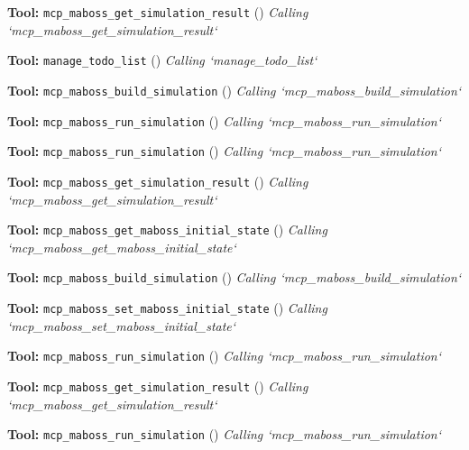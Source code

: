 \documentclass[11pt,a4paper]{article}
\begin{document}
\begin{toolokbox}
\textbf{Tool:} \texttt{mcp\_maboss\_get\_simulation\_result} (\checkmark)
\textit{Calling `mcp\_maboss\_get\_simulation\_result`}
\end{toolokbox}
\begin{toolokbox}
\textbf{Tool:} \texttt{manage\_todo\_list} (\checkmark)
\textit{Calling `manage\_todo\_list`}
\end{toolokbox}
\begin{toolokbox}
\textbf{Tool:} \texttt{mcp\_maboss\_build\_simulation} (\checkmark)
\textit{Calling `mcp\_maboss\_build\_simulation`}
\end{toolokbox}
\begin{toolokbox}
\textbf{Tool:} \texttt{mcp\_maboss\_run\_simulation} (\checkmark)
\textit{Calling `mcp\_maboss\_run\_simulation`}
\end{toolokbox}
\begin{toolokbox}
\textbf{Tool:} \texttt{mcp\_maboss\_run\_simulation} (\checkmark)
\textit{Calling `mcp\_maboss\_run\_simulation`}
\end{toolokbox}
\begin{toolokbox}
\textbf{Tool:} \texttt{mcp\_maboss\_get\_simulation\_result} (\checkmark)
\textit{Calling `mcp\_maboss\_get\_simulation\_result`}
\end{toolokbox}
\begin{toolokbox}
\textbf{Tool:} \texttt{mcp\_maboss\_get\_maboss\_initial\_state} (\checkmark)
\textit{Calling `mcp\_maboss\_get\_maboss\_initial\_state`}
\end{toolokbox}
\begin{toolokbox}
\textbf{Tool:} \texttt{mcp\_maboss\_build\_simulation} (\checkmark)
\textit{Calling `mcp\_maboss\_build\_simulation`}
\end{toolokbox}
\begin{toolokbox}
\textbf{Tool:} \texttt{mcp\_maboss\_set\_maboss\_initial\_state} (\checkmark)
\textit{Calling `mcp\_maboss\_set\_maboss\_initial\_state`}
\end{toolokbox}
\begin{toolokbox}
\textbf{Tool:} \texttt{mcp\_maboss\_run\_simulation} (\checkmark)
\textit{Calling `mcp\_maboss\_run\_simulation`}
\end{toolokbox}
\begin{toolokbox}
\textbf{Tool:} \texttt{mcp\_maboss\_get\_simulation\_result} (\checkmark)
\textit{Calling `mcp\_maboss\_get\_simulation\_result`}
\end{toolokbox}
\begin{toolokbox}
\textbf{Tool:} \texttt{mcp\_maboss\_run\_simulation} (\checkmark)
\textit{Calling `mcp\_maboss\_run\_simulation`}
\end{toolokbox}
\end{document}
